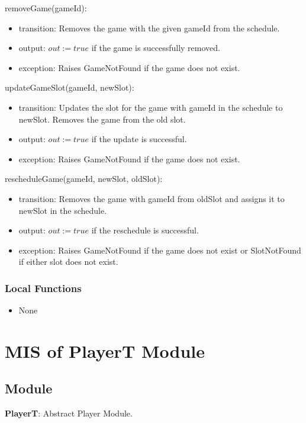 \documentclass[12pt, titlepage]{article}
\begin{document}
\noindent removeGame(gameId):
\begin{itemize}
    \item transition: Removes the game with the given gameId from the schedule.
    \item output: $out := true$ if the game is successfully removed.
    \item exception: Raises GameNotFound if the game does not exist.
\end{itemize}

\noindent updateGameSlot(gameId, newSlot):
\begin{itemize}
    \item transition: Updates the slot for the game with gameId in the schedule to newSlot. Removes the game from the old slot.
    \item output: $out := true$ if the update is successful.
    \item exception: Raises GameNotFound if the game does not exist.
\end{itemize}

\noindent rescheduleGame(gameId, newSlot, oldSlot):
\begin{itemize}
    \item transition: Removes the game with gameId from oldSlot and assigns it to newSlot in the schedule.
    \item output: $out := true$ if the reschedule is successful.
    \item exception: Raises GameNotFound if the game does not exist or SlotNotFound if either slot does not exist.
\end{itemize}

\subsubsection{Local Functions}
\begin{itemize}
    \item None
\end{itemize}

\newpage

\section{MIS of PlayerT Module} \label{PlayerTModule}

\subsection{Module}
\textbf{PlayerT}: Abstract Player Module.
\end{document}
